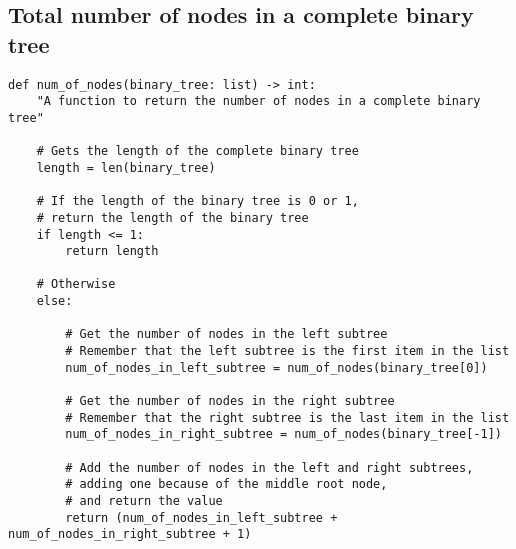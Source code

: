 \documentclass[11pt]{article}
\begin{document}
\subsection{Total number of nodes in a complete binary tree}
\label{sec:org8360253}
\begin{verbatim}
def num_of_nodes(binary_tree: list) -> int:
    "A function to return the number of nodes in a complete binary tree"

    # Gets the length of the complete binary tree
    length = len(binary_tree)

    # If the length of the binary tree is 0 or 1,
    # return the length of the binary tree
    if length <= 1:
        return length

    # Otherwise
    else:

        # Get the number of nodes in the left subtree
        # Remember that the left subtree is the first item in the list
        num_of_nodes_in_left_subtree = num_of_nodes(binary_tree[0])

        # Get the number of nodes in the right subtree
        # Remember that the right subtree is the last item in the list
        num_of_nodes_in_right_subtree = num_of_nodes(binary_tree[-1])

        # Add the number of nodes in the left and right subtrees,
        # adding one because of the middle root node,
        # and return the value
        return (num_of_nodes_in_left_subtree + num_of_nodes_in_right_subtree + 1)
\end{verbatim}

 \newpage
\end{document}
